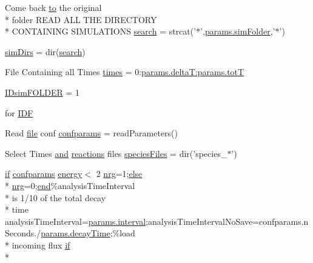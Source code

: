 \begin{DoxyCompactItemize}
Come back \hyperlink{a00028_af71dbe52628a3f83a77ab494817525c6}{to} the original \\*
folder R\-E\-A\-D A\-L\-L T\-H\-E D\-I\-R\-E\-C\-T\-O\-R\-Y \\*
C\-O\-N\-T\-A\-I\-N\-I\-N\-G S\-I\-M\-U\-L\-A\-T\-I\-O\-N\-S \hyperlink{a00028_ab3186e0326a3b47b2cfcb5577ab5139f}{search} = strcat('$\ast$',\hyperlink{a00032_aa671e3345005bd599e662bcaa115b18a}{params.\-sim\-Folder},'$\ast$')
\item 
\hyperlink{a00028_aae5035eb84b89176ed5b06e136325eff}{sim\-Dirs} = dir(\hyperlink{a00028_ab3186e0326a3b47b2cfcb5577ab5139f}{search})
\item 
File Containing all Times \hyperlink{a00028_a47868b053902b822eab5c738a67a633a}{times} = 0\-:\hyperlink{a00036_aa9758857dd92f7845934f06daa7c4120}{params.\-delta\-T\-:params.\-tot\-T}
\item 
\hyperlink{a00028_aeef3e34bd64eec758eac16f004cdcef0}{I\-Dsim\-F\-O\-L\-D\-E\-R} = 1
\item 
for \hyperlink{a00028_a8acdc1bee73718b1ffcfc7eb26968f48}{I\-D\-F}
\item 
Read \hyperlink{a00110_a4e8353d6c62cf54bf4a1a8f63e56b8c3}{file} conf \hyperlink{a00028_a000cb2f4b2f69aebbfb0e8e0809567f6}{confparams} = read\-Parameters()
\item 
Select Times \hyperlink{a00028_a170f8acb213f91bf71c77b1d20bceb33}{and} \hyperlink{a00021}{reactions} files \hyperlink{a00028_af5703745c2c2a6af7f62da460994d9c2}{species\-Files} = dir('species\-\_$\ast$')
\item 
\hyperlink{a00030_a01d55766b8058903dd360b4bda71f9f5}{if} \hyperlink{a00033_a53a794fb4119b36e89d14a405e075596}{confparams} \hyperlink{a00113_ac002779c383d2cc783e881f94449de66}{energy}$<$ 2 \hyperlink{a00028_af837f695e5b67c86016c1a82608c38b4}{nrg}=1;\hyperlink{a00031_af5946383720aa572eb93e1e63afc23c2}{else} \\*
\hyperlink{a00028_af837f695e5b67c86016c1a82608c38b4}{nrg}=0;\hyperlink{a00025_afb358f48b1646c750fb9da6c6585be2b}{end}\%analysis\-Time\-Interval \\*
is 1/10 of the total decay \\*
time analysis\-Time\-Interval=\hyperlink{a00028_a4d8f56ee83b9b4dbe17b218746a1768c}{params.\-interval};analysis\-Time\-Interval\-No\-Save=confparams.\-n\-Seconds./\hyperlink{a00036_afb6aa83fb78c663f3b39be2380842a8b}{params.\-decay\-Time};\%load \\*
incoming flux \hyperlink{a00030_a01d55766b8058903dd360b4bda71f9f5}{if} \\*

\end{DoxyCompactItemize}
